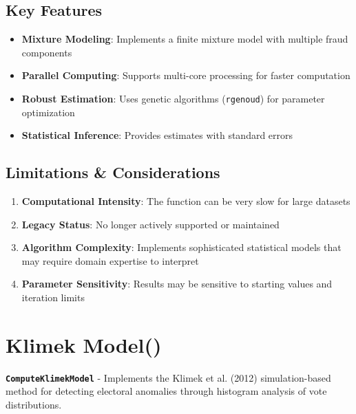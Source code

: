 \documentclass{article}
\begin{document}
\subsection{Key Features}
\begin{itemize}
    \item \textbf{Mixture Modeling}: Implements a finite mixture model with multiple fraud components
    \item \textbf{Parallel Computing}: Supports multi-core processing for faster computation
    \item \textbf{Robust Estimation}: Uses genetic algorithms (\texttt{rgenoud}) for parameter optimization
    \item \textbf{Statistical Inference}: Provides estimates with standard errors
\end{itemize}

\subsection{Limitations \& Considerations}
\begin{enumerate}
    \item \textbf{Computational Intensity}: The function can be very slow for large datasets
    \item \textbf{Legacy Status}: No longer actively supported or maintained
    \item \textbf{Algorithm Complexity}: Implements sophisticated statistical models that may require domain expertise to interpret
    \item \textbf{Parameter Sensitivity}: Results may be sensitive to starting values and iteration limits
\end{enumerate}

\section{Klimek Model()}

\textbf{\texttt{ComputeKlimekModel}} - Implements the Klimek et al. (2012) simulation-based method for detecting electoral anomalies through histogram analysis of vote distributions.

\begin{center}
\end{center}
\end{document}
